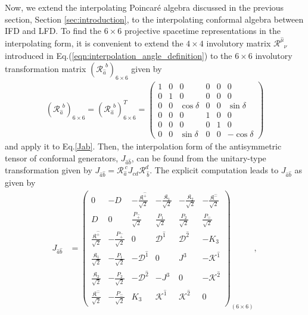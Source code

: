 \documentclass[foundations,article,submit,pdftex,moreauthors]{Definitions/mdpi}
\newcommand{\muT}{\hat{\mu}}
\newcommand{\itP}[1]{\hat{#1}}
\begin{document}
Now, we extend the interpolating Poincar\'e algebra discussed in the previous section, Section \ref{sec:introduction}, to the interpolating conformal algebra between IFD and LFD.  
To find the $6\times6$ projective spacetime representations in the interpolating form, it is convenient to extend the $4\times4$ involutory matrix $\mathcal{R}^{\muT}_{\phantom{\mu}{\nu}}$ introduced in Eq.(\ref{eqn:interpolation_angle_definition}) to the  
 $6\times6$ {involutory} transformation matrix $(\mathcal{R}_{\hat{a}}^{\phantom{b}{b}})_{6\times6}$ given by
\begin{align}
    (\mathcal{R}_{\hat{a}}^{\phantom{b}{b}})_{6\times6}=(\mathcal{R}_{\hat{a}}^{\phantom{b}{b}})^T_{6\times6}=\begin{pmatrix}
    1&0&0&0&0&0\\
    0&1&0&0&0&0\\
    0&0&\cos{\delta}&0&0&\sin{\delta}\\
    0&0&0&1&0&0\\
    0&0&0&0&1&0\\
    0&0&\sin{\delta}&0&0&-\cos{\delta}
    \end{pmatrix}
    \label{Rmatrix}
\end{align}
and apply it to Eq.\eqref{Jab}. Then, the interpolation form of the antisymmetric tensor of conformal generators, $J_{\hat{a}\hat{b}}$, can be found from the unitary-type transformation given by  $J_{\hat{a}\hat{b}}=\mathcal{R}_{\hat{a}}^{~{c}}J_{cd}\mathcal{R}_{~\hat{b}}^{{d}}$. The explicit computation leads to $J_{\hat{a}\hat{b}}$ as given by
\begin{align}
    J_{\hat{a}\hat{b}}&=\begin{pmatrix}
    0&-D&-\frac{\mathfrak{K}^{\hat{+}}}{\sqrt{2}}&-\frac{\mathfrak{K}_1}{\sqrt{2}}&-\frac{\mathfrak{K}_2}{\sqrt{2}}&-\frac{\mathfrak{K}^{\hat{-}}}{\sqrt{2}}\\
    D&0&\frac{P_{\hat{+}}}{\sqrt{2}}&\frac{P_{1}}{\sqrt{2}}&\frac{P_{2}}{\sqrt{2}}&\frac{P_{\hat{-}}}{\sqrt{2}}\\
    \frac{\mathfrak{K}^{\hat{+}}}{\sqrt{2}}&-\frac{P_{\hat{+}}}{\sqrt{2}}&0 & {\mathcal{D}}^{\itP{1}} & {\mathcal{D}}^{\itP{2}} & -K_3\\
    \frac{\mathfrak{K}_1}{\sqrt{2}}&-\frac{P_{1}}{\sqrt{2}}&-{\mathcal{D}}^{\itP{1}} & 0 & {J}^{3} & -{\mathcal{K}}^{\itP{1}}\\
    \frac{\mathfrak{K}_2}{\sqrt{2}}&-\frac{P_{2}}{\sqrt{2}}&-{\mathcal{D}}^{\itP{2}} & -{J}^{3} & 0 & -{\mathcal{K}}^{\itP{2}}\\
    \frac{\mathfrak{K}^{\hat{-}}}{\sqrt{2}}&-\frac{P_{\hat{-}}}{\sqrt{2}}&K_3 & {\mathcal{K}}^{\itP{1}} & {\mathcal{K}}^{\itP{2}} & 0
  \end{pmatrix}_{(6\times6)}
  \label{Jhat+hat-} ,
\end{align}
\end{document}
